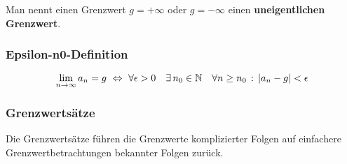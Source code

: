 \begin{Bemerkung}
Man nennt einen Grenzwert $g=+\infty$ oder $g=-\infty$ einen \textbf{uneigentlichen Grenzwert}.
\end{Bemerkung}


\subsubsection{Epsilon-n0-Definition}
\begin{Definition}
$$\lim\limits_{n\to\infty}a_n=g \ \Leftrightarrow\ \forall  \epsilon > 0\quad \exists\, n_0 \in\N \quad \forall n\geq n_0\,:\, |a_n-g|<\epsilon$$
\end{Definition}
\subsubsection{Grenzwertsätze}


Die Grenzwertsätze führen die Grenzwerte komplizierter Folgen auf einfachere Grenzwertbetrachtungen bekannter Folgen zurück.\\
\begin{Theorem}
\end{Theorem}


